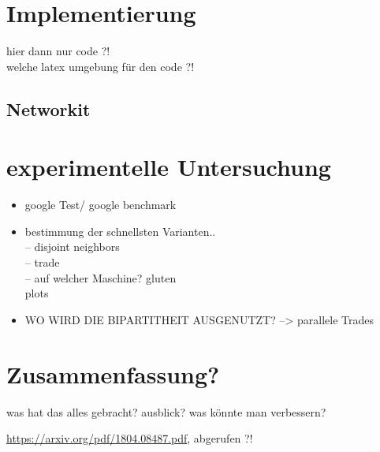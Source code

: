 \documentclass[a4paper]{scrreprt}
\theoremstyle{plain} %
\theoremstyle{definition} %
\begin{document}
\chapter{Implementierung}
hier dann nur code ?! 
\\
welche latex umgebung für den code ?!
\section{Networkit}


\chapter{experimentelle Untersuchung}

\begin{itemize}
\item
google Test/ google benchmark

\item
bestimmung der schnellsten Varianten..\\
-- disjoint neighbors\\
-- trade\\
-- auf welcher Maschine? gluten\\
plots\\

\item
WO WIRD DIE BIPARTITHEIT AUSGENUTZT?
--> parallele Trades


\end{itemize}


\chapter{Zusammenfassung?}
was hat das alles gebracht?
ausblick?
was könnte man verbessern?




\begin{thebibliography}{2}
 \url{https://arxiv.org/pdf/1804.08487.pdf}, abgerufen ?!

\end{thebibliography}


\end{document}
